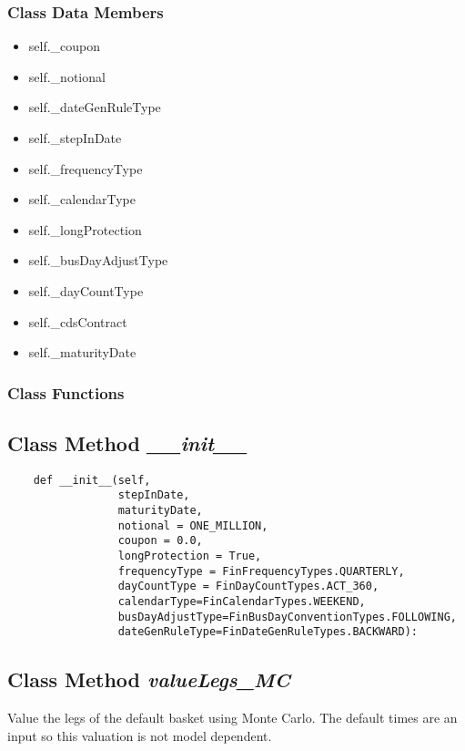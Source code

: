 \documentclass[twoside,11pt]{book}
\begin{document}
\subsubsection{Class Data Members}
\begin{itemize}
\item{self.\_coupon}
\item{self.\_notional}
\item{self.\_dateGenRuleType}
\item{self.\_stepInDate}
\item{self.\_frequencyType}
\item{self.\_calendarType}
\item{self.\_longProtection}
\item{self.\_busDayAdjustType}
\item{self.\_dayCountType}
\item{self.\_cdsContract}
\item{self.\_maturityDate}
\end{itemize}

\subsubsection{Class Functions}

\subsection{Class Method {\it \_\_init\_\_}}


\begin{lstlisting}
    def __init__(self, 
                 stepInDate,
                 maturityDate, 
                 notional = ONE_MILLION, 
                 coupon = 0.0, 
                 longProtection = True,
                 frequencyType = FinFrequencyTypes.QUARTERLY,
                 dayCountType = FinDayCountTypes.ACT_360,
                 calendarType=FinCalendarTypes.WEEKEND,
                 busDayAdjustType=FinBusDayConventionTypes.FOLLOWING,
                 dateGenRuleType=FinDateGenRuleTypes.BACKWARD):
\end{lstlisting}

\subsection{Class Method {\it valueLegs\_MC}}
Value the legs of the default basket using Monte Carlo. The default times are an input so this valuation is not model dependent. 
\end{document}
